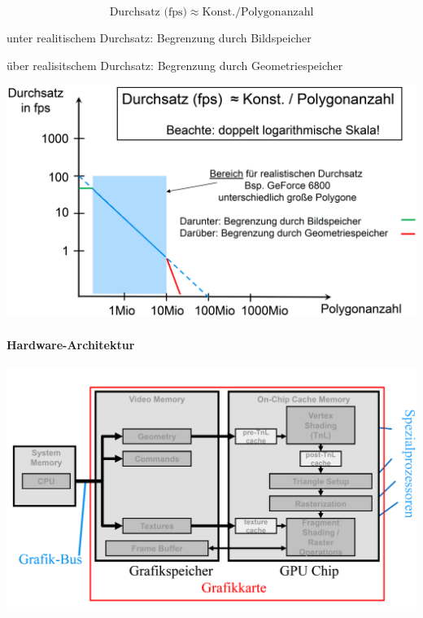 \documentclass[landscape]{article}
\begin{document}
\begin{multicols}{3}
  $$\text{Durchsatz (fps)} \approx \text{Konst.} / \text{Polygonanzahl}$$
  \begin{itemize*}
    \item unter realitischem Durchsatz: Begrenzung durch Bildspeicher
    \item über realisitschem Durchsatz: Begrenzung durch Geometriespeicher
  \end{itemize*}
  \begin{center}
    \includegraphics[width=.9\linewidth]{Assets/Computergrafik_GPU-Performance}
  \end{center}
  
  \paragraph{Hardware-Architektur}
  \begin{center}
    \includegraphics[width=.9\linewidth]{Assets/Computergrafik_GPU_Hardware}
  \end{center}
  
\end{multicols}
\newpage
\end{document}

